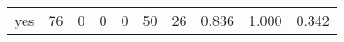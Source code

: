 \begin{longtable}{lp{1.3cm}p{1.3cm}p{1.3cm}p{1.3cm}p{1.3cm}p{1.3cm}p{1.3cm}p{1.3cm}p{1.3cm}}
yes       &                     76 &                                             0 &                                            0 &                                           0 &                                           50 &                                         26 &                                0.836 &                                  1.000 &                                0.342 \\
\end{longtable}
